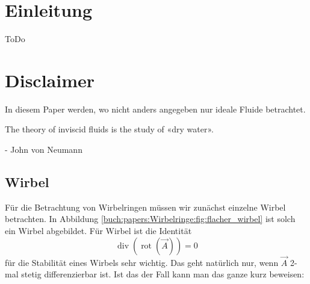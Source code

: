%
%
%
\section{Einleitung}



ToDo

\section*{Disclaimer}

In diesem Paper werden, wo nicht anders angegeben nur ideale Fluide betrachtet.

\begin{displayquote}
    The theory of inviscid fluids is the study of «dry water».

    - John von Neumann\cite{Wirbelringe:feynman1964lectures}
\end{displayquote}

\subsection{Wirbel}



Für die Betrachtung von Wirbelringen müssen wir zunächst einzelne Wirbel betrachten. 
In Abbildung \ref{buch:papers:Wirbelringe:fig:flacher_wirbel} ist solch ein Wirbel abgebildet. 
Für Wirbel ist die Identität
\[
\operatorname{div} \left( \operatorname{rot} \left( \vec{A} \right) \right) 
= 
0
\]
für die Stabilität eines Wirbels sehr wichtig. 
Das geht natürlich nur, wenn \(\vec{A}\) 2-mal stetig differenzierbar ist. 
Ist das der Fall kann man das ganze kurz beweisen:

